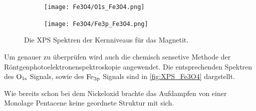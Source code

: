         \begin{figure}
            \centering
            \begin{subfigure}[t]{0.48\textwidth}
                \centering
                \texttt{[image: Fe3O4/O1s\_Fe3O4.png]}
                \label{fig:XPSO1s_Fe3O4}
            \end{subfigure}
            \begin{subfigure}[t]{0.48\textwidth}
                \centering
                \texttt{[image: Fe3O4/Fe3p\_Fe3O4.png]}
                \label{fig:XPSFe3p_Fe3O4}
            \end{subfigure}
            \caption{Die XPS Spektren der Kernniveaus für das Magnetit.}
            \label{fig:XPS_Fe3O4}
        \end{figure}
        Um genauer zu überprüfen wird auch die chemisch sensetive Methode der Röntgenphotoelektronenspektroskopie angewendet.
        Die entsprechenden Spektren des $\ce{O}_{1\text{s}}$ Signals, sowie des $\ce{Fe}_{3\text{p}}$ Signals sind in \autoref{fig:XPS_Fe3O4} dargstellt.

        Wie bereits schon bei dem Nickeloxid brachte das Aufdampfen von einer Monolage Pentacene keine geordnete Struktur mit sich.


